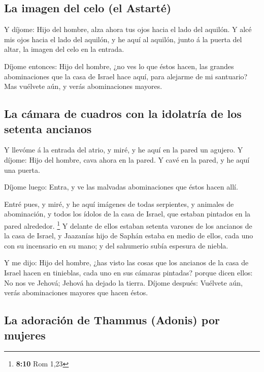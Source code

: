 \hypertarget{la-imagen-del-celo-el-astartuxe9}{%
\subsection{La imagen del celo (el
Astarté)}\label{la-imagen-del-celo-el-astartuxe9}}

 Y díjome: Hijo del hombre, alza ahora tus ojos hacia el
lado del aquilón. Y alcé mis ojos hacia el lado del aquilón, y he aquí
al aquilón, junto á la puerta del altar, la imagen del celo en la
entrada.

 Díjome entonces: Hijo del hombre, ¿no ves lo que éstos
hacen, las grandes abominaciones que la casa de Israel hace aquí, para
alejarme de mi santuario? Mas vuélvete aún, y verás abominaciones
mayores.

\hypertarget{la-cuxe1mara-de-cuadros-con-la-idolatruxeda-de-los-setenta-ancianos}{%
\subsection{La cámara de cuadros con la idolatría de los setenta
ancianos}\label{la-cuxe1mara-de-cuadros-con-la-idolatruxeda-de-los-setenta-ancianos}}

 Y llevóme á la entrada del atrio, y miré, y he aquí en la
pared un agujero.  Y díjome: Hijo del hombre, cava ahora
en la pared. Y cavé en la pared, y he aquí una puerta.

 Díjome luego: Entra, y ve las malvadas abominaciones que
éstos hacen allí.

 Entré pues, y miré, y he aquí imágenes de todas
serpientes, y animales de abominación, y todos los ídolos de la casa de
Israel, que estaban pintados en la pared alrededor. \footnote{\textbf{8:10}
  Rom 1,23}  Y delante de ellos estaban setenta varones
de los ancianos de la casa de Israel, y Jaazanías hijo de Saphán estaba
en medio de ellos, cada uno con su incensario en su mano; y del
sahumerio subía espesura de niebla.

 Y me dijo: Hijo del hombre, ¿has visto las cosas que los
ancianos de la casa de Israel hacen en tinieblas, cada uno en sus
cámaras pintadas? porque dicen ellos: No nos ve Jehová; Jehová ha dejado
la tierra.  Díjome después: Vuélvete aún, verás
abominaciones mayores que hacen éstos.

\hypertarget{la-adoraciuxf3n-de-thammus-adonis-por-mujeres}{%
\subsection{La adoración de Thammus (Adonis) por
mujeres}\label{la-adoraciuxf3n-de-thammus-adonis-por-mujeres}}

